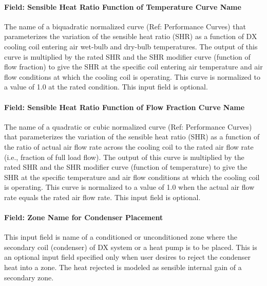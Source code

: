 \paragraph{Field: Sensible Heat Ratio Function of Temperature Curve Name}\label{field-sensible-heat-ratio-function-of-temperature-curve-name}

The name of a biquadratic normalized curve (Ref: Performance Curves) that parameterizes the variation of the sensible heat ratio (SHR) as a function of DX cooling coil entering air wet-bulb and dry-bulb temperatures. The output of this curve is multiplied by the rated SHR and the SHR modifier curve (function of flow fraction) to give the SHR at the specific coil entering air temperature and air flow conditions at which the cooling coil is operating. This curve is normalized to a value of 1.0 at the rated condition. This input field is optional.

\paragraph{Field: Sensible Heat Ratio Function of Flow Fraction Curve Name}\label{field-sensible-heat-ratio-function-of-flow-fraction-curve-name}

The name of a quadratic or cubic normalized curve (Ref: Performance Curves) that parameterizes the variation of the sensible heat ratio (SHR) as a function of the ratio of actual air flow rate across the cooling coil to the rated air flow rate (i.e., fraction of full load flow). The output of this curve is multiplied by the rated SHR and the SHR modifier curve (function of temperature) to give the SHR at the specific temperature and air flow conditions at which the cooling coil is operating. This curve is normalized to a value of 1.0 when the actual air flow rate equals the rated air flow rate. This input field is optional.

\paragraph{Field: Zone Name for Condenser Placement}\label{field-zone-name-for-condenser-placement}

This input field is name of a conditioned or unconditioned zone where the secondary coil (condenser) of DX system or a heat pump is to be placed. This is an optional input field specified only when user desires to reject the condenser heat into a zone. The heat rejected is modeled as sensible internal gain of a secondary zone.

